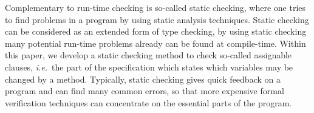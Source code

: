 \documentclass[a4paper]{llncs}
\newcommand{\cPP}{\texttt{C/C}\nolinebreak\hspace{-.05em}\raisebox{.4ex}{\tiny\bf
+}\nolinebreak\hspace{-.10em}\raisebox{.4ex}{\tiny\bf +}}
\begin{document}



Complementary to run-time checking is so-called static checking, where 
one tries to find problems in a program by using static analysis
techniques. Static checking can be considered as an extended form of
type checking, by using static checking many potential run-time
problems already can be found at compile-time.
Within this paper, we develop a static checking method to check
so-called assignable clauses, \emph{i.e.}~the part of the
specification which states which variables may be changed by a method.
Typically, static checking gives quick feedback on a program and can
find many common errors, so that more expensive formal verification
techniques can concentrate on the essential parts of the program.



\end{document}
